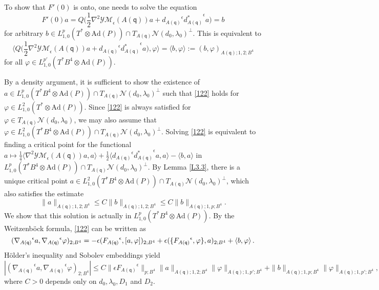 \documentclass[11pt]{article}
\numberwithin{equation}{section} \setlength{\topmargin}{-35pt}
\newcommand{\Ad}{\text{Ad}}
\newcommand{\YMe}{\mathcal{YM}_{\epsilon}}
\newcommand{\q}{\mathsf{q}}
\begin{document}
To show that $F'(0)$ is onto, one needs to solve the equation
$$F'(0)a=Q\big(\frac{1}{2}\nabla^2\YMe(A(\q))a+{d_{A(\q)}}^{\epsilon}{d_{A(\q)}^{\ast}}^{\epsilon}a\big)=b$$
for arbitrary $b\in L^p_{1,0}(T^{\ast}\otimes\Ad(P))\cap
T_{A(\q)}\mathcal{N}(d_0,\lambda_0)^{\perp}$. This is equivalent to
\begin{equation}
\label{122} \Big\langle
Q\Big(\frac{1}{2}\nabla^2\YMe(A(\q))a+{d_{A(\q)}}^{\epsilon}{d_{A(\q)}^{\ast}}^{\epsilon}a\Big),\varphi\Big\rangle=\langle
b,\varphi\rangle :=(b,\varphi)_{A(\q);1,2;B^4}
\end{equation}
for all $\varphi\in L^{p'}_{1,0}(T^{\ast}B^4\otimes\Ad(P))$.

By a density argument, it is sufficient to show the existence of
$a\in L^p_{1,0}(T^{\ast}B^4\otimes\Ad(P))\cap
T_{A(\q)}\mathcal{N}(d_0,\lambda_0)^{\perp}$ such that \eqref{122}
holds for $\varphi\in L^2_{1,0}(T^{\ast}\otimes\Ad(P))$. Since
\eqref{122} is always satisfied for $\varphi\in
T_{A(\q)}\mathcal{N}(d_0,\lambda_0)$, we may also assume that
$\varphi\in L^2_{1,0}(T^{\ast}B^4\otimes\Ad(P))\cap
T_{A(\q)}\mathcal{N}(d_0,\lambda_0)^{\perp}$. Solving \eqref{122} is
equivalent to finding a critical point for the functional $a\mapsto
\frac{1}{4}\langle\nabla^2\YMe(A(\q))a,a\rangle+\frac{1}{2}\langle
{d_{A(\q)}}^{\epsilon}{d_{A(\q)}^{\ast}}^{\epsilon}a,a\rangle-\langle
b,a\rangle$ in $L^p_{1,0}(T^{\ast}B^4\otimes\Ad(P))\cap
T_{A(\q)}\mathcal{N}(d_0,\lambda_0)^{\perp}$. By Lemma \ref{L3.3},
there is a unique critical point $a\in
L^2_{1,0}(T^{\ast}B^4\otimes\Ad(P))\cap
T_{A(\q)}\mathcal{N}(d_0,\lambda_0)^{\perp}$, which also satisfies
the estimate
\begin{equation}
\label{123} \|a\|_{A(\q);1,2;B^4}\le C\|b\|_{A(\q);1,2;B^4}\le
C\|b\|_{A(\q);1,p;B^4}.
\end{equation}
We show that this solution is actually in
$L^p_{1,0}(T^{\ast}B^4\otimes\Ad(P))$. By the Weitzenb\"ock formula,
\eqref{122} can be written as
\begin{equation}
\notag
({\nabla_{A(\q)}}^{\epsilon}a,{\nabla_{A(\q)}}^{\epsilon}\varphi)_{2;B^4}=-\epsilon({F_{A(\q)}}^{\epsilon},[a,\varphi])_{2;B^4}+
\epsilon(\{{F_{A(\q)}}^{\epsilon},\varphi\},a)_{2;B^4}+ \langle
b,\varphi\rangle\,.
\end{equation}
H\"older's inequality and Sobolev embeddings yield
\begin{equation}
\label{125}
|({\nabla_{A(\q)}}^{\epsilon}a,{\nabla_{A(\q)}}^{\epsilon}\varphi)_{2;B^4}|\le
C\|\epsilon{F_{A(\q)}}^{\epsilon}\|_{p;B^4}\|a\|_{A(\q);1,2;B^4}\|
\varphi\|_{A(\q);1,p';B^4}+\|b\|_{A(\q);1,p;B^4}\|\varphi\|_{A(\q);1,p';B^4},
\end{equation}
where $C>0$ depends only on $d_0,\lambda_0,D_1$ and $D_2$.
\end{document}

